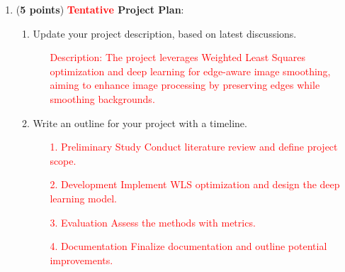 \begin{enumerate}
\item ({\bf 5 points}) {\bf \textcolor{red}{Tentative} Project Plan}:
  \begin{enumerate}
  \item Update your project description, based on latest discussions.

\begin{enumerate}
    \item[\textcolor{red}{Description:}] 
    \textcolor{red}{The project leverages Weighted Least Squares optimization and deep learning for edge-aware image smoothing, aiming to enhance image processing by preserving edges while smoothing backgrounds.}
\end{enumerate}

  \item Write an outline for your project with a timeline.

\begin{enumerate}
    \item[\textcolor{red}{1. Preliminary Study}]
    \textcolor{red}{Conduct literature review and define project scope.}
    
    \item[\textcolor{red}{2. Development}]
    \textcolor{red}{Implement WLS optimization and design the deep learning model.}
    
    \item[\textcolor{red}{3. Evaluation}]
    \textcolor{red}{Assess the methods with metrics.}
    
    \item[\textcolor{red}{4. Documentation}]
    \textcolor{red}{Finalize documentation and outline potential improvements.}
\end{enumerate}

  \end{enumerate}

\end{enumerate}

